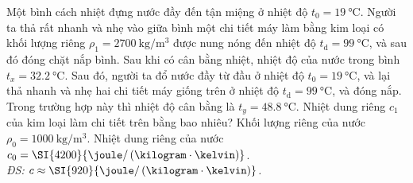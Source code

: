 \begin{ex}
	Một bình cách nhiệt đựng nước đầy đến tận miệng ở nhiệt độ  $t_0=\SI{19}{\celsius}$. Người ta thả rất nhanh và nhẹ vào giữa bình một chi tiết máy làm bằng kim loại có khối lượng riêng $\rho_1=\SI{2700}{\kilogram/\meter^3}$ được nung nóng đến nhiệt độ $t_\mathrm{d}=\SI{99}{\celsius}$, và sau đó đóng chặt nắp bình. Sau khi có cân bằng nhiệt, nhiệt độ của nước trong bình $t_x=\SI{32.2}{\celsius}$. Sau đó, người ta đổ nước đầy từ đầu ở nhiệt độ $t_0=\SI{19}{\celsius}$, và lại thả nhanh và nhẹ hai chi tiết máy giống trên ở nhiệt độ $t_\mathrm{d}=\SI{99}{\celsius}$, và đóng nắp. Trong trường hợp này thì nhiệt độ cân bằng là $t_y=\SI{48.8}{\celsius}$. Nhiệt dung riêng $c_1$ của kim loại làm chi tiết trên bằng bao nhiêu? Khối lượng riêng của nước $\rho_0=\SI{1000}{\kilogram/\meter^3}$. Nhiệt dung riêng của nước $c_0=\SI{4200}{\joule/\left(\kilogram\cdot\kelvin\right)}$.\\
	\hspace*{0pt}\hfill\textit{ĐS: $c\approx\SI{920}{\joule/\left(\kilogram\cdot\kelvin\right)}$.}
	\loigiai{
		
	}
\end{ex}
